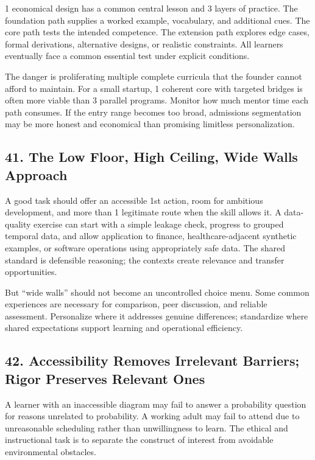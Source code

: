 1 economical design has a common central lesson and 3 layers of practice. The foundation path supplies a worked example, vocabulary, and additional cues. The core path tests the intended competence. The extension path explores edge cases, formal derivations, alternative designs, or realistic constraints. All learners eventually face a common essential test under explicit conditions.

The danger is proliferating multiple complete curricula that the founder cannot afford to maintain. For a small startup, 1 coherent core with targeted bridges is often more viable than 3 parallel programs. Monitor how much mentor time each path consumes. If the entry range becomes too broad, admissions segmentation may be more honest and economical than promising limitless personalization.

\subsection*{41. The Low Floor, High Ceiling, Wide Walls Approach}

A good task should offer an accessible 1st action, room for ambitious development, and more than 1 legitimate route when the skill allows it. A data-quality exercise can start with a simple leakage check, progress to grouped temporal data, and allow application to finance, healthcare-adjacent synthetic examples, or software operations using appropriately safe data. The shared standard is defensible reasoning; the contexts create relevance and transfer opportunities.

But ``wide walls'' should not become an uncontrolled choice menu. Some common experiences are necessary for comparison, peer discussion, and reliable assessment. Personalize where it addresses genuine differences; standardize where shared expectations support learning and operational efficiency.

\subsection*{42. Accessibility Removes Irrelevant Barriers; Rigor Preserves Relevant Ones}

A learner with an inaccessible diagram may fail to answer a probability question for reasons unrelated to probability. A working adult may fail to attend due to unreasonable scheduling rather than unwillingness to learn. The ethical and instructional task is to separate the construct of interest from avoidable environmental obstacles.

